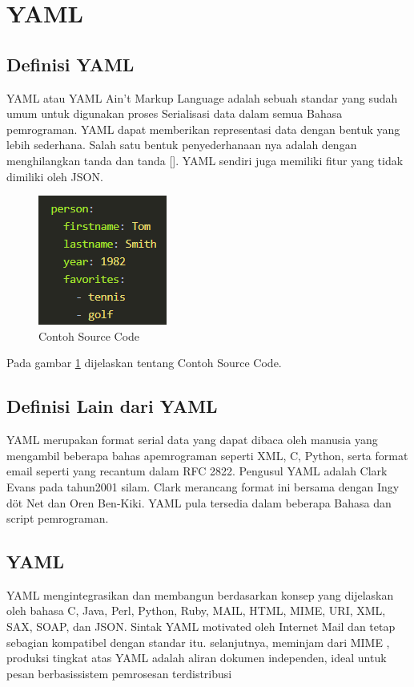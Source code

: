 \documentclass[a4paper]{article}
\begin{document}
\section{YAML}
\subsection{Definisi YAML}
YAML atau YAML Ain't Markup Language adalah sebuah standar yang sudah umum untuk digunakan proses Serialisasi data dalam semua Bahasa pemrograman. YAML dapat memberikan representasi data dengan bentuk yang lebih sederhana. Salah satu bentuk penyederhanaan nya adalah dengan menghilangkan tanda {} dan tanda []. YAML sendiri juga memiliki fitur yang tidak dimiliki oleh JSON.
\begin{figure}[ht]
\centerline{\includegraphics[scale=1]{../figures/5SC.png} }

\caption{Contoh Source Code} 
\label{Sc}
\end{figure}

Pada gambar \ref{Sc} dijelaskan tentang Contoh Source Code.

\subsection{Definisi Lain dari YAML}
YAML merupakan format serial data yang dapat dibaca oleh manusia yang mengambil beberapa bahas apemrograman seperti XML, C, Python, serta format email seperti yang recantum dalam RFC 2822. Pengusul YAML adalah Clark Evans pada tahun2001 silam. Clark merancang format ini bersama dengan Ingy döt Net dan Oren Ben-Kiki. YAML pula tersedia dalam beberapa Bahasa dan script pemrograman.
\subsection{YAML}
YAML mengintegrasikan dan membangun berdasarkan konsep yang dijelaskan oleh bahasa C, Java, Perl, Python, Ruby, MAIL,  HTML, MIME, URI, XML, SAX, SOAP, dan JSON.
Sintak YAML motivated oleh Internet Mail  dan tetap sebagian kompatibel dengan standar itu. selanjutnya, meminjam dari MIME , produksi tingkat atas YAML adalah aliran dokumen independen, ideal untuk pesan berbasissistem pemrosesan terdistribusi
\end{document}
